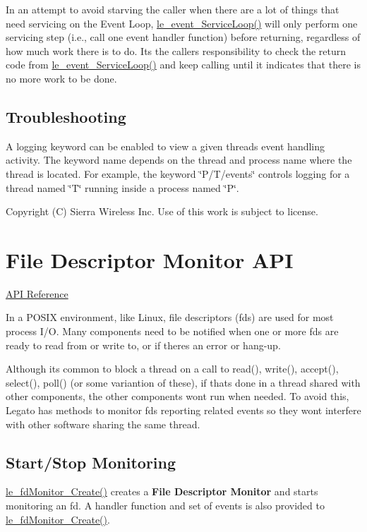 In an attempt to avoid starving the caller when there are a lot of things that need servicing on the Event Loop, {\ttfamily \hyperlink{le__event_loop_8h_a096222e98f6a0d92a79722018a752b58}{le\+\_\+event\+\_\+\+Service\+Loop()}} will only perform one servicing step (i.\+e., call one event handler function) before returning, regardless of how much work there is to do. It\textquotesingle{}s the caller\textquotesingle{}s responsibility to check the return code from \hyperlink{le__event_loop_8h_a096222e98f6a0d92a79722018a752b58}{le\+\_\+event\+\_\+\+Service\+Loop()} and keep calling until it indicates that there is no more work to be done.\hypertarget{c_event_loop_c_event_troubleshooting}{}\subsection{Troubleshooting}\label{c_event_loop_c_event_troubleshooting}
A logging keyword can be enabled to view a given thread\textquotesingle{}s event handling activity. The keyword name depends on the thread and process name where the thread is located. For example, the keyword \char`\"{}\+P/\+T/events\char`\"{} controls logging for a thread named \char`\"{}\+T\char`\"{} running inside a process named \char`\"{}\+P\char`\"{}.





Copyright (C) Sierra Wireless Inc. Use of this work is subject to license. \hypertarget{c_fdMonitor}{}\section{File Descriptor Monitor A\+P\+I}\label{c_fdMonitor}
\hyperlink{le__fd_monitor_8h}{A\+P\+I Reference}





In a P\+O\+S\+I\+X environment, like Linux, file descriptors (fds) are used for most process I/\+O. Many components need to be notified when one or more fds are ready to read from or write to, or if there\textquotesingle{}s an error or hang-\/up.

Although it\textquotesingle{}s common to block a thread on a call to {\ttfamily read()}, {\ttfamily write()}, {\ttfamily accept()}, {\ttfamily select()}, {\ttfamily poll()} (or some variantion of these), if that\textquotesingle{}s done in a thread shared with other components, the other components won\textquotesingle{}t run when needed. To avoid this, Legato has methods to monitor fds reporting related events so they won\textquotesingle{}t interfere with other software sharing the same thread.\hypertarget{c_fd_monitor_c_fdMonitorStartStop}{}\subsection{Start/\+Stop Monitoring}\label{c_fd_monitor_c_fdMonitorStartStop}
\hyperlink{le__fd_monitor_8h_a52902d634d810f9b7a23c53c9c5164f0}{le\+\_\+fd\+Monitor\+\_\+\+Create()} creates a {\bfseries  File Descriptor Monitor } and starts monitoring an fd. A handler function and set of events is also provided to \hyperlink{le__fd_monitor_8h_a52902d634d810f9b7a23c53c9c5164f0}{le\+\_\+fd\+Monitor\+\_\+\+Create()}.



